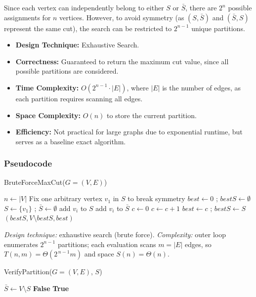 \documentclass[12pt]{article}
\begin{document}
Since each vertex can independently belong to either $S$ or $\bar{S}$, 
there are $2^n$ possible assignments for $n$ vertices. However, to avoid 
symmetry (as $(S,\bar{S})$ and $(\bar{S},S)$ represent the same cut), 
the search can be restricted to $2^{n-1}$ unique partitions.

\begin{itemize}
    \item \textbf{Design Technique:} Exhaustive Search. 
    \item \textbf{Correctness:} Guaranteed to return the maximum cut value, 
    since all possible partitions are considered. 
    \item \textbf{Time Complexity:} $O(2^{n-1}\cdot |E|)$, where $|E|$ is the 
    number of edges, as each partition requires scanning all edges. 
    \item \textbf{Space Complexity:} $O(n)$ to store the current partition.
    \item \textbf{Efficiency:} Not practical for large graphs due to exponential 
    runtime, but serves as a baseline exact algorithm.
\end{itemize}

\subsubsection{Pseudocode}

\begin{algorithm}[H]
\caption{BruteForceMaxCut($G=(V,E)$)}
\begin{algorithmic}[1]
\State $n \gets |V|$
\State Fix one arbitrary vertex $v_1$ in $S$ to break symmetry
\State $best \gets 0$ ; $bestS \gets \emptyset$
 
    \State $S \gets \{v_1\}$ ; $\bar{S} \gets \emptyset$
            \State add $v_i$ to $S$
        \Else
            \State add $v_i$ to $\bar{S}$
        \EndIf
    \EndFor
    \State $c \gets 0$
            \State $c \gets c+1$
        \EndIf
    \EndFor
        \State $best \gets c$ ; $bestS \gets S$
    \EndIf
\EndFor
\State \Return $(bestS, V \setminus bestS, best)$
\end{algorithmic}
\end{algorithm}
\noindent\textit{Design technique:} exhaustive search (brute force).
\quad
\textit{Complexity:} outer loop enumerates $2^{n-1}$ partitions; each evaluation scans $m=|E|$ edges,
so $T(n,m)=\Theta(2^{\,n-1}m)$ and space $S(n)=\Theta(n)$.
\begin{algorithm}[H]
\caption{VerifyPartition($G=(V,E)$, $S$)}
\begin{algorithmic}[1]
\State $\bar{S} \gets V \setminus S$
    \State \Return \textbf{False}
\EndIf
\State \Return \textbf{True}
\end{algorithmic}
\end{algorithm}
\end{document}

